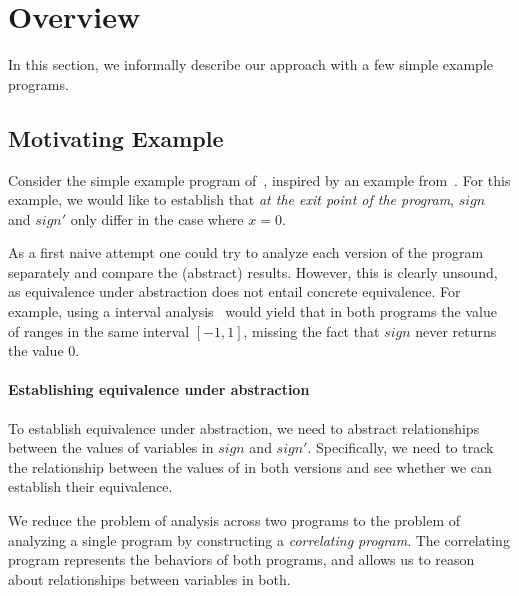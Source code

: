 \section{Overview}

In this section, we informally describe our approach with a few simple example programs.

\subsection{Motivating Example}



Consider the simple example program of~, inspired by an example from~\cite{RM:TOPLAS07}. For this example, we would like to establish that \emph{at the exit point of the program}, $sign$ and $sign'$ only differ in the case where $x=0$.

As a first naive attempt one could try to analyze each version of the program separately and compare the (abstract) results. However, this is clearly unsound, as equivalence under abstraction does not entail concrete equivalence. For example, using a interval analysis~\cite{TODO} would yield that in both programs the value of  ranges in the same interval $[-1,1]$, missing the fact that $sign$ never returns the value $0$.


\paragraph{Establishing equivalence under abstraction}
To establish equivalence under abstraction, we need to abstract relationships between the values of variables in $sign$ and $sign'$. Specifically, we need to track the relationship between the values of  in both versions and see whether we can establish their equivalence.


We reduce the problem of analysis across two programs to the problem of analyzing a single program by constructing a \emph{correlating program}. The correlating program represents the behaviors of both programs, and allows us to reason about relationships between variables in both. 



